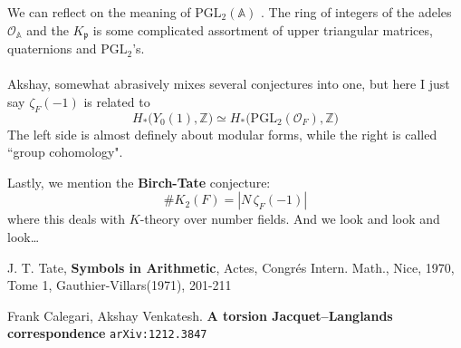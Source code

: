 \documentclass[12pt]{article}
\begin{document}
We can reflect on the meaning of $\mathrm{PGL}_2(\mathbb{A})$ . The ring of integers of the adeles $\mathcal{O}_\mathbb{A}$ and the $K_\mathfrak{p}$ is some complicated assortment of upper triangular matrices, quaternions and $\mathrm{PGL}_2$'s. \\ \\
Akshay, somewhat abrasively mixes several conjectures into one, but here I just say $\zeta_F(-1)$ is related to 
$$ H_\ast \big( Y_0(1) , \mathbb{Z} \big) \simeq 
H_\ast \big( \mathrm{PGL}_2(\mathcal{O}_F), \mathbb{Z} \big)  $$
The left side is almost definely about modular forms, while the right is called ``group cohomology". 

\newpage

\noindent Lastly, we mention the {\color{green!50!blue}\textbf{Birch-Tate}} conjecture:
$$ \# K_2(F) =  | N \, \zeta_F(-1) |  $$
where this deals with $K$-theory over number fields.  And we look and look and look\dots

\vfill



\begin{thebibliography}{}

\item J. T. Tate, \textbf{Symbols in Arithmetic}, Actes, Congr\'{e}s Intern. Math., Nice, 1970, Tome 1, Gauthier-Villars(1971), 201-211

\item Frank Calegari, Akshay Venkatesh.  \textbf{A torsion Jacquet--Langlands correspondence} \texttt{arXiv:1212.3847}

\end{thebibliography}
\end{document}
